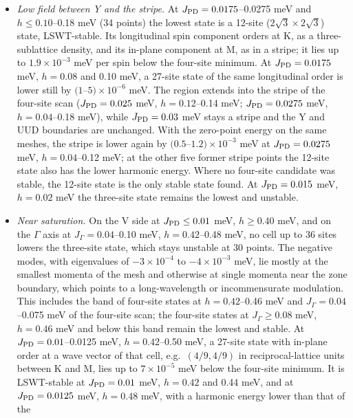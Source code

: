 \begin{itemize}
\item
  \emph{Low field between Y and the stripe.} At
  \(J_{\rm PD}=0.0175\)--0.0275 meV and \(h\le0.10\)--0.18 meV
  (34 points) the lowest state is a 12-site
  (\(2\sqrt3\times2\sqrt3\)) state, LSWT-stable. Its longitudinal
  spin component orders at K, as a three-sublattice density, and its
  in-plane component at M, as in a stripe; it lies up to
  \(1.9\times10^{-3}\) meV per spin below the four-site minimum. At
  \(J_{\rm PD}=0.0175\) meV, \(h=0.08\) and 0.10 meV, a 27-site state of
  the same longitudinal order is lower still by
  \((1\)--\(5)\times10^{-6}\) meV. The region extends into the stripe of the
  four-site scan (\(J_{\rm PD}=0.025\) meV, \(h=0.12\)--0.14 meV;
  \(J_{\rm PD}=0.0275\) meV, \(h=0.04\)--0.18 meV), while
  \(J_{\rm PD}=0.03\) meV stays a stripe and the Y and UUD boundaries are
  unchanged. With the zero-point energy on the same meshes, the stripe
  is lower again by \((0.5\)--\(1.2)\times10^{-3}\) meV at
  \(J_{\rm PD}=0.0275\) meV, \(h=0.04\)--0.12 meV; at the other five
  former stripe points the 12-site state also has the lower harmonic
  energy. Where no four-site candidate was stable, the 12-site state is
  the only stable state found. At
  \(J_{\rm PD}=0.015\) meV, \(h=0.02\) meV the three-site state remains
  the lowest and unstable.
\item
  \emph{Near saturation.} On the V side at \(J_{\rm PD}\le0.01\) meV,
  \(h\ge0.40\) meV, and on the \(\Gamma\) axis at
  \(J_\Gamma=0.04\)--0.10 meV, \(h=0.42\)--0.48 meV, no cell up to 36
  sites lowers the three-site state, which stays unstable at 30 points.
  The negative modes, with eigenvalues of \(-3\times10^{-4}\) to
  \(-4\times10^{-3}\) meV, lie mostly at the smallest momenta of the mesh
  and otherwise at single momenta near the zone boundary, which points to
  a long-wavelength or incommensurate modulation. This includes the band
  of four-site states at \(h=0.42\)--0.46 meV and
  \(J_\Gamma=0.04\)--0.075 meV of the four-site scan; the four-site
  states at \(J_\Gamma\ge0.08\) meV, \(h=0.46\) meV and below this band
  remain the lowest and stable. At \(J_{\rm PD}=0.01\)--0.0125 meV,
  \(h=0.42\)--0.50 meV, a 27-site state with in-plane order at a
  wave vector of that cell, e.g.\ \((4/9,4/9)\) in reciprocal-lattice
  units between K and M, lies up to \(7\times10^{-5}\) meV below the
  four-site minimum. It is LSWT-stable at \(J_{\rm PD}=0.01\) meV,
  \(h=0.42\) and 0.44 meV, and at \(J_{\rm PD}=0.0125\) meV,
  \(h=0.48\) meV, with a harmonic energy lower than that of the

\end{itemize}
